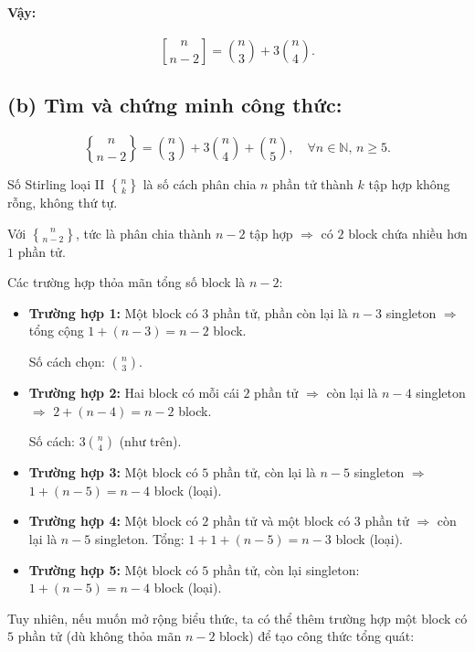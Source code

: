 \documentclass{article}
\newcommand{\stirlingI}[2]{\genfrac{[}{]}{0pt}{}{#1}{#2}}
\newcommand{\stirlingII}[2]{\genfrac{\{}{\}}{0pt}{}{#1}{#2}}
\begin{document}
	\paragraph{Vậy:}
	\[
	\stirlingI{n}{n - 2} = \binom{n}{3} + 3\binom{n}{4}.
	\]
	
	\subsection*{(b) Tìm và chứng minh công thức:}
	\[
	\stirlingII{n}{n - 2} = \binom{n}{3} + 3\binom{n}{4} + \binom{n}{5},\quad \forall n \in \mathbb{N},\, n \ge 5.
	\]
	
	Số Stirling loại II $\stirlingII{n}{k}$ là số cách phân chia $n$ phần tử thành $k$ tập hợp không rỗng, không thứ tự.
	
	Với $\stirlingII{n}{n - 2}$, tức là phân chia thành $n - 2$ tập hợp $\Rightarrow$ có $2$ block chứa nhiều hơn $1$ phần tử.
	
	Các trường hợp thỏa mãn tổng số block là $n - 2$:
	\begin{itemize}
		\item \textbf{Trường hợp 1:} Một block có $3$ phần tử, phần còn lại là $n - 3$ singleton $\Rightarrow$ tổng cộng $1 + (n - 3) = n - 2$ block.
		
		Số cách chọn: $\binom{n}{3}$.
		
		\item \textbf{Trường hợp 2:} Hai block có mỗi cái $2$ phần tử $\Rightarrow$ còn lại là $n - 4$ singleton $\Rightarrow$ $2 + (n - 4) = n - 2$ block.
		
		Số cách: $3\binom{n}{4}$ (như trên).
		
		\item \textbf{Trường hợp 3:} Một block có $5$ phần tử, còn lại là $n - 5$ singleton $\Rightarrow$ $1 + (n - 5) = n - 4$ block (loại).
		
		\item \textbf{Trường hợp 4:} Một block có $2$ phần tử và một block có $3$ phần tử $\Rightarrow$ còn lại là $n - 5$ singleton. Tổng: $1 + 1 + (n - 5) = n - 3$ block (loại).
		
		\item \textbf{Trường hợp 5:} Một block có $5$ phần tử, còn lại singleton: $1 + (n - 5) = n - 4$ block (loại).
	\end{itemize}
	
	Tuy nhiên, nếu muốn mở rộng biểu thức, ta có thể thêm trường hợp một block có $5$ phần tử (dù không thỏa mãn $n - 2$ block) để tạo công thức tổng quát:
	
\end{document}
